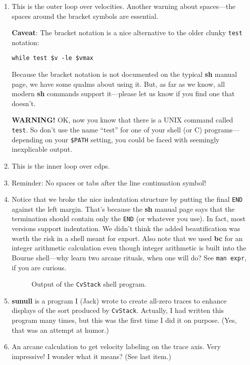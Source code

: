 {{{{{{{\begin{enumerate}
\item This is the outer loop over velocities.
Another warning about spaces---the spaces around the bracket
symbols are essential.

{\bf Caveat}: The bracket notation is a nice
alternative to the older clunky \verb:test: notation:
{\small\begin{verbatim}
while test $v -le $vmax
\end{verbatim}}\noindent
Because the bracket notation is not documented on the typical {\bf sh} manual
page, we have some qualms about using it.  But, as far as we know,
all modern {\bf sh} commands support it---please let us know
if you find one that doesn't.

{\bf WARNING!}  OK, now you know that there is a UNIX command
called \verb:test:.  So don't use the name ``test'' for one of your
shell (or C) programs---depending on your \verb:$PATH: setting, you could
be faced with seemingly inexplicable output.

\item This is the inner loop over cdps.

\item Reminder: No spaces or tabs after the line continuation
symbol!

\item Notice that we broke the nice indentation structure by
putting the final \verb:END: against the left margin.  That's because
the {\bf sh} manual page says that the termination should contain
only the \verb:END: (or whatever you use).  In fact, most versions
support indentation.  We didn't think the added beautification was
worth the risk in a shell meant for export.  Also note that we used
{\bf bc} for an integer arithmetic calculation even though
integer arithmetic is built into the Bourne shell---why learn
two arcane rituals, when one will do?  See \verb:man expr:, if
you are curious.
\begin{figure}[htbp]
\epsfysize 300pt
\centerline{}
\caption{Output of the \protect\verb:CvStack: shell program.}
\label{fig:cvstack}
\end{figure}

\item {\bf sunull} is a program I (Jack) wrote to create all-zero traces
to enhance displays of the sort produced by \verb:CvStack:.
Actually, I had written this program many times, but this was the first
time I did it on purpose.  (Yes, that was an attempt at humor.)

\item An arcane calculation to get velocity labeling
on the trace axis.  Very impressive!  I wonder what it means?
(See last item.)


\end{enumerate}}}}}}}}
